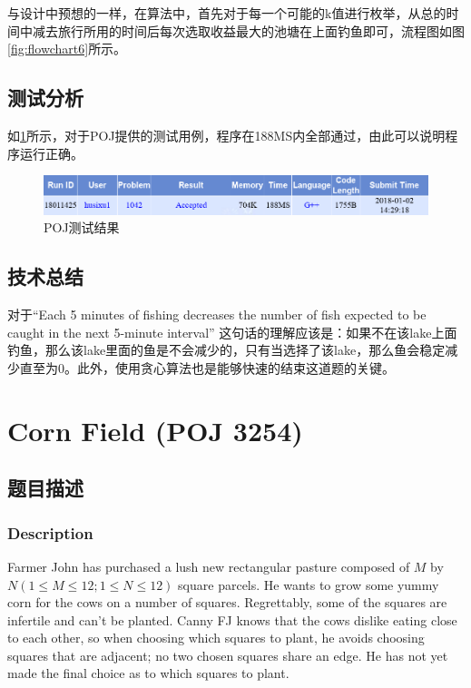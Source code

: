 \documentclass{report}
\begin{document}
与设计中预想的一样，在算法中，首先对于每一个可能的k值进行枚举，从总的时间中减去旅行所用的时间后每次选取收益最大的池塘在上面钓鱼即可，流程图如图\ref{fig:flowchart6}所示。

\section{测试分析}
\label{sec:ce_shi_fen_xi_6}
如\ref{fig:result6}所示，对于POJ提供的测试用例，程序在188MS内全部通过，由此可以说明程序运行正确。

\begin{figure}[ht]
    \centering
    \includegraphics[width=0.9\linewidth]{result6.png}
    \caption{POJ测试结果}
    \label{fig:result6}
\end{figure}

\section{技术总结}
\label{sec:ji_zhu_zong_jie_6}
对于``Each 5 minutes of fishing decreases the number of fish expected to be caught in the next 5-minute interval'' 这句话的理解应该是：如果不在该lake上面钓鱼，那么该lake里面的鱼是不会减少的，只有当选择了该lake，那么鱼会稳定减少直至为0。此外，使用贪心算法也是能够快速的结束这道题的关键。

\chapter{Corn Field (POJ 3254)}
\label{cha:corn_field_poj_3254_}

\section{题目描述}
\label{sec:ti_mu_miao_shu_7}

\subsection{Description}
Farmer John has purchased a lush new rectangular pasture composed of $M$ by $N (1 \leq M \leq 12; 1 \leq N \leq 12)$ square parcels. He wants to grow some yummy corn for the cows on a number of squares. Regrettably, some of the squares are infertile and can't be planted. Canny FJ knows that the cows dislike eating close to each other, so when choosing which squares to plant, he avoids choosing squares that are adjacent; no two chosen squares share an edge. He has not yet made the final choice as to which squares to plant.\par
\end{document}
